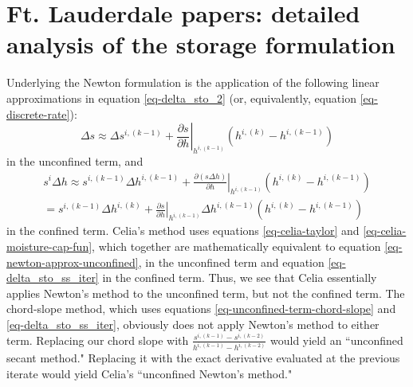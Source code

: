 \documentclass[fleqn]{article}
\begin{document}
\section{Ft. Lauderdale papers: detailed analysis of the storage formulation}
Underlying the Newton formulation is the application of the following linear approximations in equation \ref{eq-delta_sto_2} (or, equivalently,
equation \ref{eq-discrete-rate}):
\begin{equation}
  \Delta s \approx \Delta s^{i,(k-1)} +
  \left. \frac{\partial s}{\partial h}\right|_{h^{i,(k-1)}}
  \left ( h^{i,(k)} - h^{i,(k-1)} \right )
  \label{eq-newton-approx-unconfined}
\end{equation}
in the unconfined term, and
\begin{equation}
  \begin{split}
    s^{i} \Delta h \approx s^{i,(k-1)} \Delta h^{i,(k-1)} +
    \left. \frac{\partial \left ( s \Delta h \right )}{\partial h}\right|_{h^{i,(k-1)}}
    \left ( h^{i,(k)} - h^{i,(k-1)} \right )\\
    = s^{i,(k-1)} \Delta h^{i,(k)} +
    \left. \frac{\partial s}{\partial h}\right|_{h^{i,(k-1)}}
    \Delta h^{i,(k-1)} \left ( h^{i,(k)} - h^{i,(k-1)} \right )
  \end{split}
  \label{eq-newton-approx-confined}
\end{equation}
in the confined term. Celia's method uses equations \ref{eq-celia-taylor} and \ref{eq-celia-moisture-cap-fun}, which together are mathematically equivalent to equation \ref{eq-newton-approx-unconfined}, in the unconfined term and equation \ref{eq-delta_sto_ss_iter} in the confined term. Thus, we see that Celia essentially applies Newton's method to the unconfined term, but not the confined term. The chord-slope method, which uses equations \ref{eq-unconfined-term-chord-slope} and \ref{eq-delta_sto_ss_iter}, obviously does not apply Newton's method to either term. Replacing our chord slope with $\frac{s^{i,(k-1)} - s^{i,(k-2)}}{h^{i,(k-1)} - h^{i,(k-2)}}$ would yield an ``unconfined secant method." Replacing it with the exact derivative evaluated at the previous iterate would yield Celia's ``unconfined Newton's method."
\end{document}
